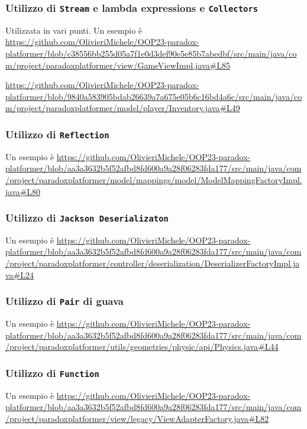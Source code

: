 \documentclass[a4paper,12pt]{report}
\begin{document}
	\subsubsection{Utilizzo di \texttt{Stream} e lambda expressions e \texttt{Collectors}}
	Utilizzata in vari punti.
	Un esempio è
	\url{https://github.com/OlivieriMichele/OOP23-paradox-platformer/blob/c38556bb255d05a7f1e0d3def90e5e85b7abedbf/src/main/java/com/project/paradoxplatformer/view/GameViewImpl.java#L85}
	
	\url{https://github.com/OlivieriMichele/OOP23-paradox-platformer/blob/9840a583905bdab26639a7a675e05b6c16bd4a6c/src/main/java/com/project/paradoxplatformer/model/player/Inventory.java#L49}
	
	\subsubsection{Utilizzo di \texttt{Reflection}}
	Un esempio è
	\url{https://github.com/OlivieriMichele/OOP23-paradox-platformer/blob/aa3a3632b5f52afbd8fd600a9a28f06283fda177/src/main/java/com/project/paradoxplatformer/model/mappings/model/ModelMappingFactoryImpl.java#L80}
	
	\subsubsection{Utilizzo di \texttt{Jackson Deserializaton}}
	Un esempio è
	\url{https://github.com/OlivieriMichele/OOP23-paradox-platformer/blob/aa3a3632b5f52afbd8fd600a9a28f06283fda177/src/main/java/com/project/paradoxplatformer/controller/deserialization/DeserializerFactoryImpl.java#L24}
	
	\subsubsection{Utilizzo di \texttt{Pair} di guava}
	Un esempio è
	\url{https://github.com/OlivieriMichele/OOP23-paradox-platformer/blob/aa3a3632b5f52afbd8fd600a9a28f06283fda177/src/main/java/com/project/paradoxplatformer/utils/geometries/physic/api/Physics.java#L44}
	
	\subsubsection{Utilizzo di \texttt{Function}}
	Un esempio è
	\url{https://github.com/OlivieriMichele/OOP23-paradox-platformer/blob/aa3a3632b5f52afbd8fd600a9a28f06283fda177/src/main/java/com/project/paradoxplatformer/view/legacy/ViewAdapterFactory.java#L82}
	
\end{document}
